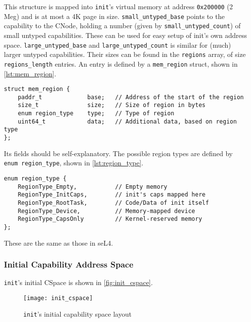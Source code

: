 \documentclass{scrreprt}
\begin{document}
  This structure is mapped into \lstinline+init+'s virtual memory at
  address \lstinline+0x200000+ (2 Meg) and is at most a 4K page in
  size. \lstinline+small_untyped_base+ points to the capability to the
  CNode, holding a number (given by \lstinline+small_untyped_count+) of
  small untyped capabilities. These can be used for easy setup of
  init's own address space. \lstinline+large_untyped_base+ and
  \lstinline+large_untyped_count+ is similar for (much) larger untyped
  capabilities. Their sizes can be found in the \lstinline+regions+ array,
  of size \lstinline+regions_length+ entries. An entry is defined by a
  \lstinline+mem_region+ struct, shown in \autoref{lst:mem_region}.

\begin{lstlisting}[float,caption={\lstinline+mem_region+ structure},
  label=lst:mem_region]
struct mem_region {
    paddr_t             base;   // Address of the start of the region
    size_t              size;   // Size of region in bytes
    enum region_type    type;   // Type of region
    uint64_t            data;   // Additional data, based on region type
};
\end{lstlisting}

  Its fields should be self-explanatory. The possible region types are
  defined by \lstinline+enum region_type+, shown in \autoref{lst:region_type}.

\begin{lstlisting}[float,caption={\lstinline+region_type+ enumeration},
  label=lst:region_type]
enum region_type {
    RegionType_Empty,           // Empty memory
    RegionType_InitCaps,        // init's caps mapped here
    RegionType_RootTask,        // Code/Data of init itself
    RegionType_Device,          // Memory-mapped device
    RegionType_CapsOnly         // Kernel-reserved memory
};
\end{lstlisting}

  These are the same as those in seL4.

  \subsubsection{Initial Capability Address Space}

  \lstinline+init+'s initial CSpace is shown in \autoref{fig:init_cspace}.

  \begin{figure}
    \centering
    \texttt{[image: init\_cspace]}
    \caption{\texttt{init}'s initial capability space layout}
    \label{fig:init_cspace}
  \end{figure}
\end{document}

